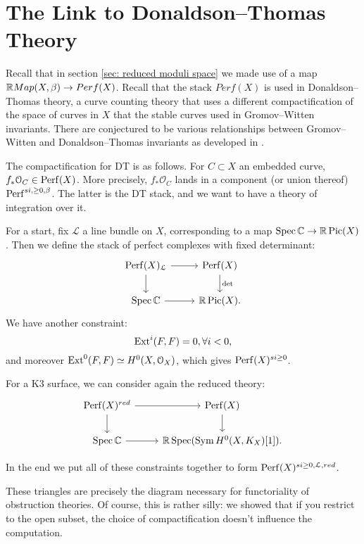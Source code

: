 \section{The Link to Donaldson--Thomas Theory}

Recall that in section \ref{sec: reduced moduli space} we made use of a map $\mathbb R Map (X,\beta)\rightarrow Perf(X) $.  Recall that the stack $Perf(X)$ is used in Donaldson--Thomas theory, a curve counting theory that uses a different compactification of the space of curves in $X$ that the stable curves used in Gromov--Witten invariants.  There are conjectured to be various relationships between Gromov--Witten and Donaldson--Thomas invariants as developed in \cite{maulik2006gromovI, maulik2006gromovII}.

The compactification for DT is as follows. For $C\subset X$ an embedded curve, $f_*\mathcal{O}_C \in \mathrm{Perf}(X)$. More precisely,
$f_*\mathcal{O}_C$ lands in a component (or union thereof) $\mathrm{Perf}^{si, \geq 0, \beta}$. The latter is the DT stack, and we want to
have a theory of integration over it.

For a start, fix $\mathcal{L}$ a line bundle on $X$, corresponding to a map $\operatorname{Spec} \mathbb C \to \mathbb R \operatorname{Pic}(X)$. Then we define the stack
of perfect complexes with fixed determinant:
\[
\begin{tikzcd}
\Perf(X)_{\mathcal{L}} \arrow{r}\arrow{d} & \Perf(X)\arrow{d}{\det} \\
\Spec \C \arrow{r} & \R\Pic(X).
\end{tikzcd}
\]
We have another constraint:
\[	\operatorname{Ext}^i(F,F) = 0, \forall i<0,	\]
and moreover $\operatorname{Ext}^0(F,F) \simeq H^0(X,\mathcal{O}_X)$, which gives $\mathrm{Perf}(X)^{si \geq 0}$.

For a K3 surface, we can consider again the reduced theory:
\[
\begin{tikzcd}
\Perf(X)^{red} \arrow{r}\arrow{d} & \Perf(X)\arrow{d} \\
\Spec \C \arrow{r} & \R \Spec (\Sym H^0(X,K_X)[1]) .
\end{tikzcd}
\]

In the end we put all of these constraints together to form $\mathrm{Perf}(X)^{si \geq 0, \mathcal{L}, red}$.


These triangles are precisely the diagram necessary for functoriality of obstruction theories. Of course, this is rather silly:
we showed that if you restrict to the open subset, the choice of compactification doesn't influence the computation.


